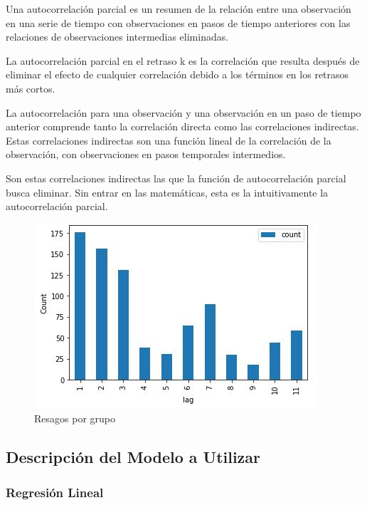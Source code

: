 Una autocorrelaci\'on parcial es un resumen de la relaci\'on entre una observaci\'on en una serie de tiempo con observaciones en pasos de tiempo anteriores con las relaciones de observaciones intermedias eliminadas.

La autocorrelaci\'on parcial en el retraso k es la correlaci\'on que resulta despu\'es de eliminar el efecto de cualquier correlaci\'on debido a los t\'erminos en los retrasos m\'as cortos.

La autocorrelaci\'on para una observaci\'on y una observaci\'on en un paso de tiempo anterior comprende tanto la correlaci\'on directa como las correlaciones indirectas. Estas correlaciones indirectas son una funci\'on lineal de la correlaci\'on de la observaci\'on, con observaciones en pasos temporales intermedios.

Son estas correlaciones indirectas las que la funci\'on de autocorrelaci\'on parcial busca eliminar. Sin entrar en las matem\'aticas, esta es la intuitivamente la autocorrelaci\'on parcial.

\begin{figure}[h!]
	\centering
	\includegraphics[width=0.8\linewidth]{Figure/Data_PartialAutocorrelation.JPG}
	\caption{Resagos por grupo} 
	\label{fig:LagLevel}
\end{figure}

\subsection{Descripci\'on del Modelo a Utilizar}

\subsubsection{Regresi\'on Lineal}

